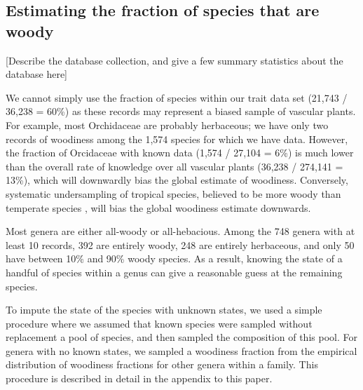 \documentclass[12pt]{article}
\begin{document}

\subsection{Estimating the fraction of species that are woody}


[Describe the database collection, and give a few summary statistics
about the database here]

We cannot simply use the fraction of species within our trait
data set (21,743 / 36,238 = 60\%) as these records may represent a
biased sample of vascular plants.
For example, most Orchidaceae are probably herbaceous; we have only
two records of woodiness among the 1,574 species for which we have
data.
However, the fraction of Orcidaceae with known data (1,574 / 27,104 =
6\%)
is much lower than the overall rate of knowledge over all vascular
plants (36,238 / 274,141 = 13\%), which will downwardly bias the
global estimate of woodiness.
%
Conversely, systematic undersampling of tropical species, believed to
be more woody than temperate species \citep{Molesheihgt}, will bias
the global woodiness estimate downwards.

Most genera are either all-woody or all-hebacious.  Among the 748
genera with at least 10 records, 392 are entirely woody, 248 are
entirely herbaceous, and only 50 have between 10\% and 90\% woody
species.  As a result, knowing the state of a handful of species
within a genus can give a reasonable guess at the remaining species.

To impute the state of the species with unknown states, we used a
simple procedure where we assumed that known species were sampled
without replacement a pool of species, and then sampled the
composition of this pool.  For genera with no known
states, we sampled a woodiness fraction from the empirical
distribution of woodiness fractions for other genera within a family. This procedure is described in detail in the appendix to this paper.
\end{document}
